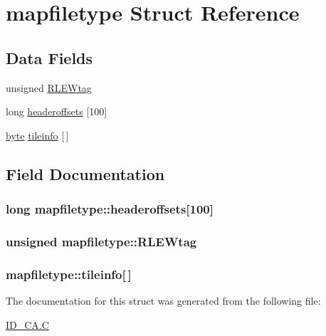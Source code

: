 \hypertarget{structmapfiletype}{
\section{mapfiletype Struct Reference}
\label{structmapfiletype}
}
\subsection*{Data Fields}
\begin{DoxyCompactItemize}
\item 
unsigned \hyperlink{structmapfiletype_afef5b15ead6b9fba9e833e66ccfec964}{RLEWtag}
\item 
long \hyperlink{structmapfiletype_a60c74a8d7ad2658cc1266b21293796df}{headeroffsets} \mbox{[}100\mbox{]}
\item 
\hyperlink{ID__HEAD_8H_a0c8186d9b9b7880309c27230bbb5e69d}{byte} \hyperlink{structmapfiletype_a2c35b4b1de4bf6ded41a55e975253759}{tileinfo} \mbox{[}$\,$\mbox{]}
\end{DoxyCompactItemize}


\subsection{Field Documentation}
\hypertarget{structmapfiletype_a60c74a8d7ad2658cc1266b21293796df}{
\subsubsection[{headeroffsets}]{\setlength{\rightskip}{0pt plus 5cm}long {\bf mapfiletype::headeroffsets}\mbox{[}100\mbox{]}}}
\label{structmapfiletype_a60c74a8d7ad2658cc1266b21293796df}
\hypertarget{structmapfiletype_afef5b15ead6b9fba9e833e66ccfec964}{
\subsubsection[{RLEWtag}]{\setlength{\rightskip}{0pt plus 5cm}unsigned {\bf mapfiletype::RLEWtag}}}
\label{structmapfiletype_afef5b15ead6b9fba9e833e66ccfec964}
\hypertarget{structmapfiletype_a2c35b4b1de4bf6ded41a55e975253759}{
\subsubsection[{tileinfo}]{ {\bf mapfiletype::tileinfo}\mbox{[}$\,$\mbox{]}}}
\label{structmapfiletype_a2c35b4b1de4bf6ded41a55e975253759}


The documentation for this struct was generated from the following file:\begin{DoxyCompactItemize}
\item 
\hyperlink{ID__CA_8C}{ID\_\-CA.C}\end{DoxyCompactItemize}
